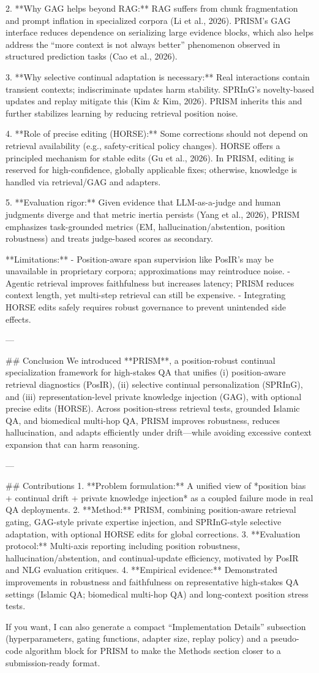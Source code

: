 2. **Why GAG helps beyond RAG:** RAG suffers from chunk fragmentation and prompt inflation in specialized corpora (Li et al., 2026). PRISM’s GAG interface reduces dependence on serializing large evidence blocks, which also helps address the “more context is not always better” phenomenon observed in structured prediction tasks (Cao et al., 2026).

3. **Why selective continual adaptation is necessary:** Real interactions contain transient contexts; indiscriminate updates harm stability. SPRInG’s novelty-based updates and replay mitigate this (Kim & Kim, 2026). PRISM inherits this and further stabilizes learning by reducing retrieval position noise.

4. **Role of precise editing (HORSE):** Some corrections should not depend on retrieval availability (e.g., safety-critical policy changes). HORSE offers a principled mechanism for stable edits (Gu et al., 2026). In PRISM, editing is reserved for high-confidence, globally applicable fixes; otherwise, knowledge is handled via retrieval/GAG and adapters.

5. **Evaluation rigor:** Given evidence that LLM-as-a-judge and human judgments diverge and that metric inertia persists (Yang et al., 2026), PRISM emphasizes task-grounded metrics (EM, hallucination/abstention, position robustness) and treats judge-based scores as secondary.

**Limitations:**  
- Position-aware span supervision like PosIR’s may be unavailable in proprietary corpora; approximations may reintroduce noise.  
- Agentic retrieval improves faithfulness but increases latency; PRISM reduces context length, yet multi-step retrieval can still be expensive.  
- Integrating HORSE edits safely requires robust governance to prevent unintended side effects.

---

## Conclusion  
We introduced **PRISM**, a position-robust continual specialization framework for high-stakes QA that unifies (i) position-aware retrieval diagnostics (PosIR), (ii) selective continual personalization (SPRInG), and (iii) representation-level private knowledge injection (GAG), with optional precise edits (HORSE). Across position-stress retrieval tests, grounded Islamic QA, and biomedical multi-hop QA, PRISM improves robustness, reduces hallucination, and adapts efficiently under drift—while avoiding excessive context expansion that can harm reasoning.

---

## Contributions  
1. **Problem formulation:** A unified view of *position bias + continual drift + private knowledge injection* as a coupled failure mode in real QA deployments.  
2. **Method:** PRISM, combining position-aware retrieval gating, GAG-style private expertise injection, and SPRInG-style selective adaptation, with optional HORSE edits for global corrections.  
3. **Evaluation protocol:** Multi-axis reporting including position robustness, hallucination/abstention, and continual-update efficiency, motivated by PosIR and NLG evaluation critiques.  
4. **Empirical evidence:** Demonstrated improvements in robustness and faithfulness on representative high-stakes QA settings (Islamic QA; biomedical multi-hop QA) and long-context position stress tests.

If you want, I can also generate a compact “Implementation Details” subsection (hyperparameters, gating functions, adapter size, replay policy) and a pseudo-code algorithm block for PRISM to make the Methods section closer to a submission-ready format.